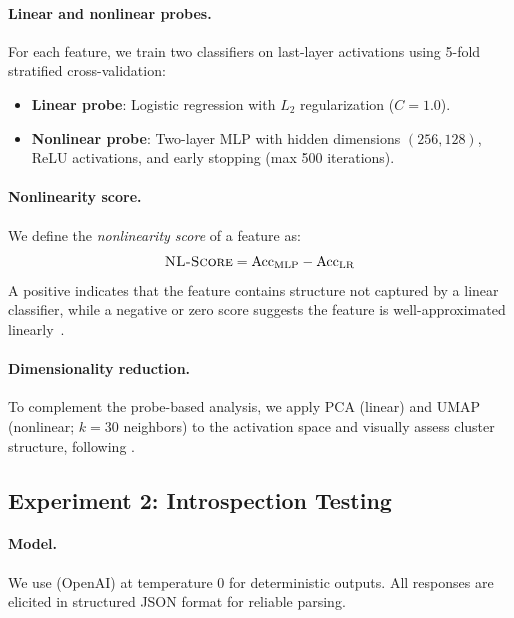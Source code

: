\paragraph{Linear and nonlinear probes.}
For each feature, we train two classifiers on last-layer activations using 5-fold stratified cross-validation:
\begin{itemize}[leftmargin=*,itemsep=2pt,topsep=2pt]
    \item \textbf{Linear probe}: Logistic regression with $L_2$ regularization ($C{=}1.0$).
    \item \textbf{Nonlinear probe}: Two-layer MLP with hidden dimensions $(256, 128)$, ReLU activations, and early stopping (max 500 iterations).
\end{itemize}

\paragraph{Nonlinearity score.}
We define the \emph{nonlinearity score} of a feature as:
\begin{equation}
    \textsc{NL-Score} = \text{Acc}_{\text{MLP}} - \text{Acc}_{\text{LR}}
    \label{eq:nlscore}
\end{equation}
A positive \nlscore indicates that the feature contains structure not captured by a linear classifier, while a negative or zero score suggests the feature is well-approximated linearly~\cite{belinkov2021probing}.

\paragraph{Dimensionality reduction.}
To complement the probe-based analysis, we apply PCA (linear) and UMAP (nonlinear; $k{=}30$ neighbors) to the activation space and visually assess cluster structure, following \citet{hildebrandt2025refusal}.

\subsection{Experiment 2: Introspection Testing}
\label{sec:introspection}

\paragraph{Model.}
We use \gptfour (OpenAI) at temperature 0 for deterministic outputs. All responses are elicited in structured JSON format for reliable parsing.

